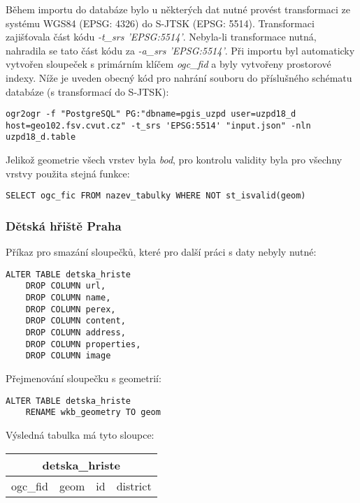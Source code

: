 \documentclass[a4paper, 12pt]{article}
\begin{document}
Během importu do databáze bylo u některých dat nutné provést transformaci ze systému WGS84 (EPSG: 4326) do S-JTSK (EPSG: 5514). Transformaci zajišťovala část kódu \linebreak \textsl{-t\_srs 'EPSG:5514'}. Nebyla-li transformace nutná, nahradila se tato část kódu za \textsl{-a\_srs 'EPSG:5514'}. Při importu byl automaticky vytvořen sloupeček s primárním klíčem \textsl{ogc\_fid} a byly vytvořeny prostorové indexy. Níže je uveden obecný kód pro nahrání souboru do příslušného schématu databáze (s transformací do S-JTSK):

\begin{lstlisting}
ogr2ogr -f "PostgreSQL" PG:"dbname=pgis_uzpd user=uzpd18_d host=geo102.fsv.cvut.cz" -t_srs 'EPSG:5514' "input.json" -nln uzpd18_d.table
\end{lstlisting}
Jelikož geometrie všech vrstev byla \textit{bod}, pro kontrolu validity byla pro všechny vrstvy použita stejná funkce:
\begin{lstlisting}
SELECT ogc_fic FROM nazev_tabulky WHERE NOT st_isvalid(geom)
\end{lstlisting}

\subsubsection*{Dětská hřiště Praha}
Příkaz pro smazání sloupečků, které pro další práci s daty nebyly nutné:
\begin{lstlisting}
ALTER TABLE detska_hriste
    DROP COLUMN url,
    DROP COLUMN name,
    DROP COLUMN perex,
    DROP COLUMN content,
    DROP COLUMN address,
    DROP COLUMN properties,
    DROP COLUMN image
\end{lstlisting}
Přejmenování sloupečku s geometrií:
\begin{lstlisting}
ALTER TABLE detska_hriste
    RENAME wkb_geometry TO geom
\end{lstlisting} 
Výsledná tabulka má tyto sloupce:
\begin{table}[h!]
\centering
\begin{tabular}{|c|c|c|c|}
\hline
\multicolumn{4}{|c|}{\textbf{detska\_hriste}} \\ \hline
ogc\_fid     & geom     & id     & district    \\ \hline
\end{tabular}
\end{table}
\end{document}
